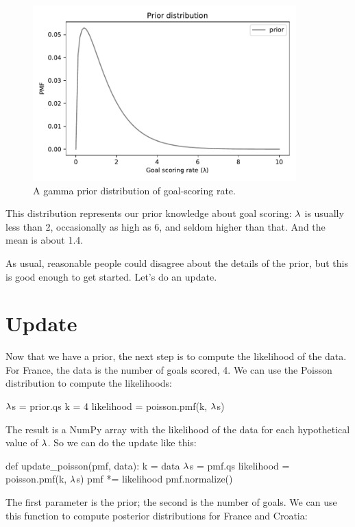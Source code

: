 \documentclass[12pt]{book}
\theoremstyle{exercise}
\begin{document}
\begin{figure}
\centerline{\includegraphics[width=4in]{figs/fig07-02.pdf}}
\caption{A gamma prior distribution of goal-scoring rate.}
\label{fig07-02}
\end{figure}

This distribution represents our prior knowledge about goal scoring: $\mathtt{\lambda}$ is usually less than 2, occasionally as high as 6, and seldom higher than that.  And the mean is about 1.4.

As usual, reasonable people could disagree about the details of the prior, but this is good enough to get started.
Let's do an update.



\section{Update}

Now that we have a prior, the next step is to compute the likelihood of the data.
For France, the data is the number of goals scored, 4.
We can use the Poisson distribution to compute the likelihoods:

\begin{code}
$\mathtt{\lambda}$s = prior.qs
k = 4
likelihood = poisson.pmf(k, $\mathtt{\lambda}$s)
\end{code}

The result is a NumPy array with the likelihood of the data for each hypothetical value of $\mathtt{\lambda}$.
So we can do the update like this:

\begin{code}
def update_poisson(pmf, data):
    k = data
    $\mathtt{\lambda}$s = pmf.qs
    likelihood = poisson.pmf(k, $\mathtt{\lambda}$s)
    pmf *= likelihood
    pmf.normalize()
\end{code}

The first parameter is the prior; the second is the number of goals.
We can use this function to compute posterior distributions for France and Croatia:
\end{document}
